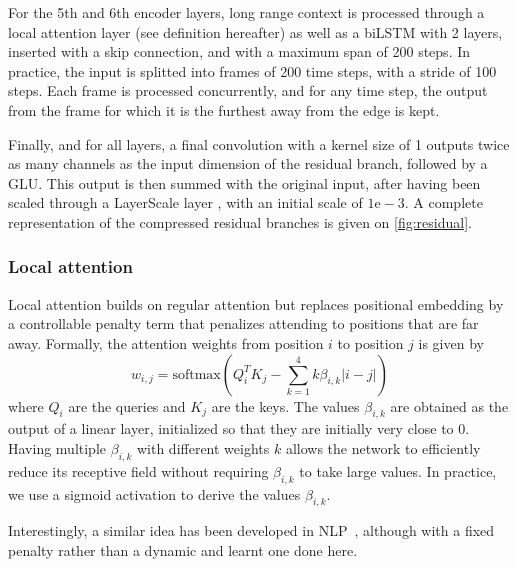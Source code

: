 \documentclass[10pt,a4paper,onecolumn]{article}
\let\origfigure\figure
\let\endorigfigure\endfigure
\renewenvironment{figure}[1][2] {
    \expandafter\origfigure\expandafter[H]
} {
    \endorigfigure
}
\begin{document}
For the 5th and 6th encoder layers, long range context is processed
through a local attention layer (see definition hereafter) as well as a
biLSTM with 2 layers, inserted with a skip connection, and with a
maximum span of 200 steps. In practice, the input is splitted into
frames of 200 time steps, with a stride of 100 steps. Each frame is
processed concurrently, and for any time step, the output from the frame
for which it is the furthest away from the edge is kept.

Finally, and for all layers, a final convolution with a kernel size of 1
outputs twice as many channels as the input dimension of the residual
branch, followed by a GLU. This output is then summed with the original
input, after having been scaled through a LayerScale layer
\citep{layerscale}, with an initial scale of \(1\mathrm{e}{-}3\). A
complete representation of the compressed residual branches is given on
\ref{fig:residual}.

\hypertarget{local-attention}{%
\subsubsection{Local attention}\label{local-attention}}

Local attention builds on regular attention \citep{attention} but
replaces positional embedding by a controllable penalty term that
penalizes attending to positions that are far away. Formally, the
attention weights from position \(i\) to position \(j\) is given by \[
w_{i, j} = \mathrm{softmax}(Q_i^T K_j - \sum_{k=1}^4 k \beta_{i, k} |i -j|) \]
where \(Q_i\) are the queries and \(K_j\) are the keys. The values
\(\beta_{i, k}\) are obtained as the output of a linear layer,
initialized so that they are initially very close to 0. Having multiple
\(\beta_{i, k}\) with different weights \(k\) allows the network to
efficiently reduce its receptive field without requiring
\(\beta_{i, k}\) to take large values. In practice, we use a sigmoid
activation to derive the values \(\beta_{i, k}\).

Interestingly, a similar idea has been developed in NLP~\citep{press2021train}, although
with a fixed penalty rather than a dynamic and learnt one done here.

\begin{figure}
\hypertarget{fig:residual}{%
\centering
\resizebox{\textwidth}{!}{
  
}
\caption{Representation of the compressed residual branches that are
added to each encoder layer. For the 5th and 6th layer, a BiLSTM and a
local attention layer are added.}\label{fig:residual}
}
\end{figure}
\end{document}
